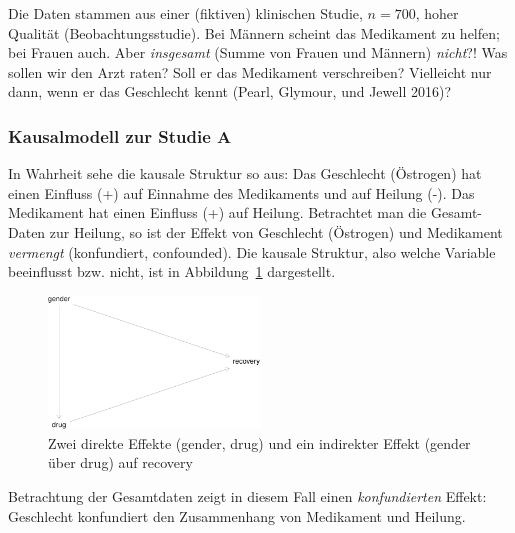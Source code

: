 \documentclass[
  a4paper,
  DIV=11]{scrreprt}
\theoremstyle{definition}
\theoremstyle{remark}
\begin{document}
Die Daten stammen aus einer (fiktiven) klinischen Studie, \(n=700\),
hoher Qualität (Beobachtungsstudie). Bei Männern scheint das Medikament
zu helfen; bei Frauen auch. Aber \emph{insgesamt} (Summe von Frauen und
Männern) \emph{nicht}?! Was sollen wir den Arzt raten? Soll er das
Medikament verschreiben? Vielleicht nur dann, wenn er das Geschlecht
kennt (Pearl, Glymour, und Jewell 2016)?

\hypertarget{kausalmodell-zur-studie-a}{%
\subsubsection{Kausalmodell zur Studie
A}\label{kausalmodell-zur-studie-a}}

In Wahrheit sehe die kausale Struktur so aus: Das Geschlecht (Östrogen)
hat einen Einfluss (+) auf Einnahme des Medikaments und auf Heilung (-).
Das Medikament hat einen Einfluss (+) auf Heilung. Betrachtet man die
Gesamt-Daten zur Heilung, so ist der Effekt von Geschlecht (Östrogen)
und Medikament \emph{vermengt} (konfundiert, confounded). Die kausale
Struktur, also welche Variable beeinflusst bzw. nicht, ist in
Abbildung~\ref{fig-dag-studie-a} dargestellt.

\begin{figure}

{\centering \includegraphics[width=0.5\textwidth,height=\textheight]{./kausal_files/figure-pdf/fig-dag-studie-a-1.pdf}

}

\caption{\label{fig-dag-studie-a}Zwei direkte Effekte (gender, drug) und
ein indirekter Effekt (gender über drug) auf recovery}

\end{figure}

Betrachtung der Gesamtdaten zeigt in diesem Fall einen
\emph{konfundierten} Effekt: Geschlecht konfundiert den Zusammenhang von
Medikament und Heilung.
\end{document}
